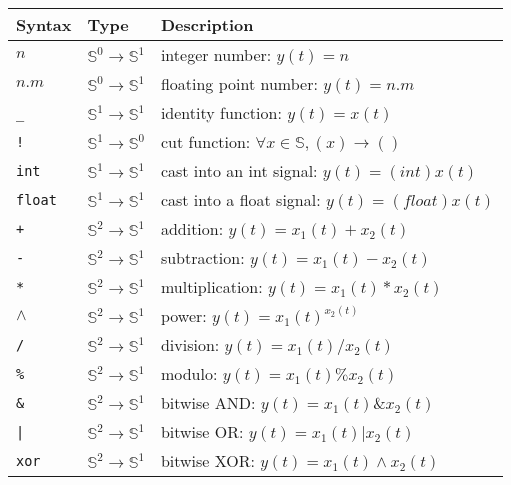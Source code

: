 \begin{tabular}{|l|l|l|}
	\hline
	\textbf{Syntax}      & \textbf{Type}                             & \textbf{Description}                                     \\
	\hline
	$n$                  & $\mathbb{S}^{0}\rightarrow\mathbb{S}^{1}$ & integer number: $y(t)=n$                                 \\
	$n.m$                & $\mathbb{S}^{0}\rightarrow\mathbb{S}^{1}$ & floating point number: $y(t)=n.m$                        \\

	\texttt{\_}          & $\mathbb{S}^{1}\rightarrow\mathbb{S}^{1}$ & identity function: $y(t)=x(t)$                           \\
	\texttt{!}           & $\mathbb{S}^{1}\rightarrow\mathbb{S}^{0}$ & cut function: $\forall x\in\mathbb{S},(x)\rightarrow ()$ \\

	\texttt{int}         & $\mathbb{S}^{1}\rightarrow\mathbb{S}^{1}$ & cast into an int signal: $y(t)=(int)x(t)$                \\
	\texttt{float}       & $\mathbb{S}^{1}\rightarrow\mathbb{S}^{1}$ & cast into a float signal: $y(t)=(float)x(t)$             \\

	\texttt{+}           & $\mathbb{S}^{2}\rightarrow\mathbb{S}^{1}$ & addition: $y(t)=x_{1}(t)+x_{2}(t)$                       \\
	\texttt{-}           & $\mathbb{S}^{2}\rightarrow\mathbb{S}^{1}$ & subtraction: $y(t)=x_{1}(t)-x_{2}(t)$                    \\
	\texttt{*}           & $\mathbb{S}^{2}\rightarrow\mathbb{S}^{1}$ & multiplication: $y(t)=x_{1}(t)*x_{2}(t)$                 \\
	\texttt{$\land$}     & $\mathbb{S}^{2}\rightarrow\mathbb{S}^{1}$ & power: $y(t)=x_{1}(t)^{x_{2}(t)}$                        \\
	\texttt{/}           & $\mathbb{S}^{2}\rightarrow\mathbb{S}^{1}$ & division: $y(t)=x_{1}(t)/x_{2}(t)$                       \\
	\texttt{\%}          & $\mathbb{S}^{2}\rightarrow\mathbb{S}^{1}$ & modulo: $y(t)=x_{1}(t)\%x_{2}(t)$                        \\

	\texttt{\&}          & $\mathbb{S}^{2}\rightarrow\mathbb{S}^{1}$ & bitwise AND: $y(t)=x_{1}(t)\&x_{2}(t)$                   \\
	\texttt{|}           & $\mathbb{S}^{2}\rightarrow\mathbb{S}^{1}$ & bitwise OR: $y(t)=x_{1}(t)|x_{2}(t)$                     \\
	\texttt{xor}         & $\mathbb{S}^{2}\rightarrow\mathbb{S}^{1}$ & bitwise XOR: $y(t)=x_{1}(t)\land x_{2}(t)$               \\


\end{tabular}
